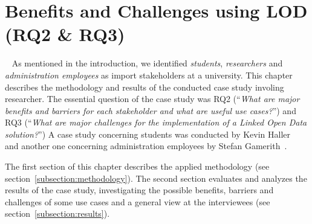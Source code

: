 \section{Benefits and Challenges using LOD (RQ2 \& RQ3)}~\label{section:benefits}
As mentioned in the introduction, we identified \textit{students}, \textit{researchers} and \textit{administration employees} as import stakeholders at a university. This chapter describes the methodology and results of the conducted case study involing researcher. The essential question of the case study was RQ2 (``\textit{What are major benefits and barriers for each stakeholder and what are useful use cases?}'') and RQ3 (``\textit{What are major challenges for the implementation of a Linked Open Data solution?}'') 
A case study concerning students was conducted by Kevin Haller~\cite{article:haller_publishing_2016} and another one concerning administration employees by Stefan Gamerith~\cite{article:gamerith_publishing_2016}.

The first section of this chapter describes the applied methodology (see section~\ref{subsection:methodology}). The second section evaluates and analyzes the results of the case study, investigating the possible benefits, barriers and challenges of some use cases and a general view at the interviewees (see section~\ref{subsection:results}).


\newpage

